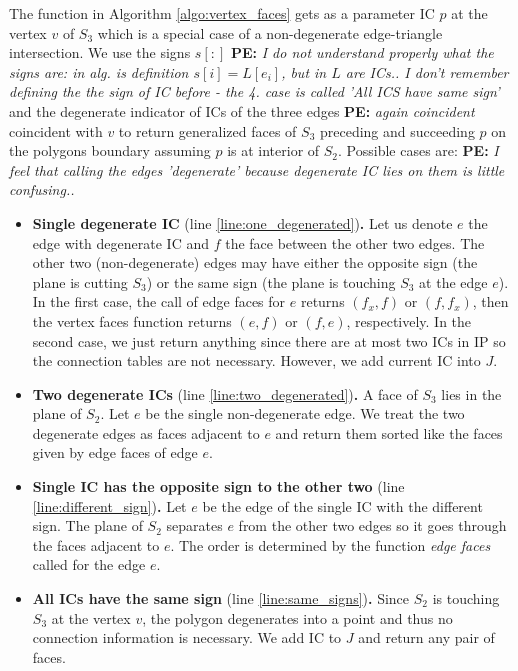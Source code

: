 \documentclass{elsarticle}
\newcommand{\notePE}[1]{{\color{Orange} \textbf{PE: } \textit{#1}}}
\begin{document}
The function in Algorithm \ref{algo:vertex_faces} gets as a parameter IC $p$ at the vertex $v$ of $S_3$ which is a special case of a non-degenerate edge-triangle intersection. 
We use the signs $s[:]$ \notePE{I do not understand properly what the signs are: in alg. is definition $s[i] = L[e_i]$, but in $L$ are ICs.. I don't remember defining the the sign of IC before - the 4. case is called 'All ICS have same sign'} and the degenerate indicator of ICs of the three edges \notePE{again coincident} coincident with $v$ to return generalized faces of $S_3$ 
preceding and succeeding $p$ on the polygons boundary assuming $p$ is at interior of $S_2$.
Possible cases are:
\notePE{I feel that calling the edges 'degenerate' because degenerate IC lies on them is little confusing..}
\begin{itemize}
 \item {\bf Single degenerate IC} (line \ref{line:one_degenerated}){\bf .} Let us denote $e$ the edge with degenerate IC 
 and $f$ the face between the other two edges.
 The other two (non-degenerate) edges may have either the opposite sign (the plane is cutting $S_3$) 
 or the same sign (the plane is touching $S_3$ at the edge $e$).
 In the first case, the call of edge faces for $e$ returns $(f_x,f)$ or $(f,f_x)$, then the vertex faces function returns $(e, f)$ or $(f, e)$, respectively.
 In the second case, we just return anything since there are at most two ICs in IP so the connection tables are not necessary. However, we add 
 current IC into $J$.
 
 \item {\bf Two degenerate ICs} (line \ref{line:two_degenerated}){\bf .} A face of $S_3$ lies in the plane of $S_2$. 
 Let $e$ be the single non-degenerate edge. We treat the two degenerate edges as faces adjacent to $e$ 
 and return them sorted like the faces given by edge faces of edge $e$.
 
 
 \item {\bf Single IC has the opposite sign to the other two} (line \ref{line:different_sign}){\bf .} 
 Let $e$ be the edge of the single IC with the different sign. 
 The plane of $S_2$ separates $e$ from the other two edges so it goes through the faces adjacent to $e$. 
 The order is determined by the function \emph{edge faces} called for the edge $e$.

 \item {\bf All ICs have the same sign} (line \ref{line:same_signs}){\bf .} Since $S_2$ is touching $S_3$ 
 at the vertex $v$, the polygon degenerates into a point and thus no connection information is necessary. We add IC to $J$ and return any pair of faces.
\end{itemize}
\end{document}
